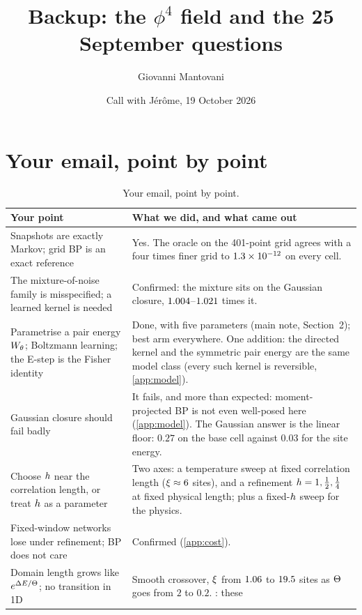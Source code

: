 \documentclass[11pt,a4paper]{article}
\title{\textbf{Backup: the $\phi^4$ field and the 25 September questions}}
\author{Giovanni Mantovani}
\date{Call with Jérôme, 19 October 2026}
\begin{document}
\maketitle
\vspace{-1.5em}
\section{Your email, point by point}
\label{app:email}

\begin{table}[h]
\centering\small
\caption{Your email, point by point.}
\label{tab:email}
\begin{tabularx}{\textwidth}{@{}>{\raggedright\arraybackslash}p{}L@{}}
\toprule
Your point & What we did, and what came out \\
\midrule
Snapshots are exactly Markov; grid BP is an exact reference & Yes. The oracle on the 401-point grid agrees with a four
times finer grid to $1.3\times10^{-12}$ on every cell. \\
The mixture-of-noise family is misspecified; a learned kernel is needed & Confirmed: the mixture sits on the Gaussian closure,
$1.004$--$1.021$ times it. \\
Parametrise a pair energy $W_\theta$; Boltzmann learning; the E-step is the Fisher identity & Done, with five parameters
(main note, Section~2); best arm everywhere. One addition: the directed kernel and the symmetric pair energy are the
same model class (every such kernel is reversible, \ref{app:model}). \\
Gaussian closure should fail badly & It fails, and more than expected: moment-projected BP is not even well-posed here
(\ref{app:model}). The Gaussian answer is the linear floor: $0.27$ on the base cell against $0.03$ for the site energy. \\
Choose $h$ near the correlation length, or treat $h$ as a parameter & Two axes: a temperature sweep at fixed
correlation length ($\xi\approx6$ sites), and a refinement $h=1,\tfrac12,\tfrac14$ at fixed physical length; plus a
fixed-$h$ sweep for the physics. \\
Fixed-window networks lose under refinement; BP does not care & Confirmed (\ref{app:cost}). \\
Domain length grows like $e^{\Delta E/\Theta}$; no transition in 1D & Smooth crossover, $\xi$ from $1.06$ to $19.5$
sites as $\Theta$ goes from $2$ to $0.2$. : these

\end{tabularx}
\end{table}
\end{document}
